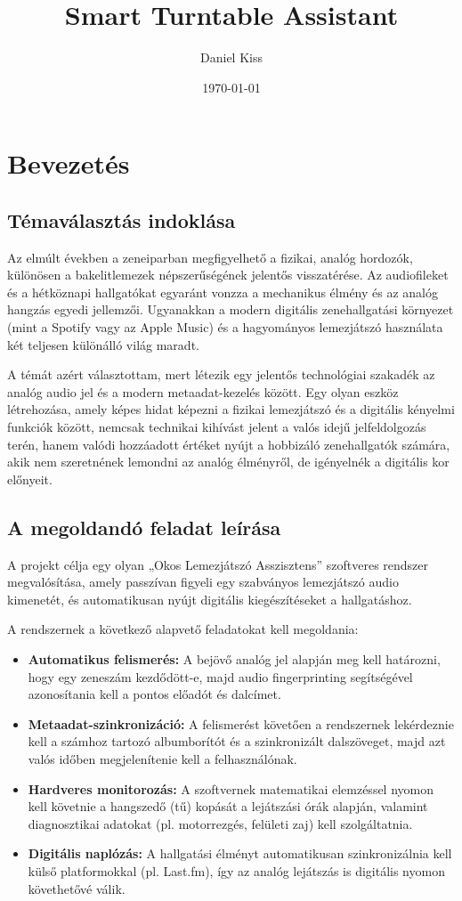 \documentclass[12pt,a4paper,hungarian]{report}
\title{Smart Turntable Assistant}
\author{Daniel Kiss}
\date{\today}
\begin{document}
 
\sloppy

\maketitle
\tableofcontents

\chapter{Bevezetés}

\section{Témaválasztás indoklása}
Az elmúlt években a zeneiparban megfigyelhető a fizikai, analóg hordozók, különösen a bakelitlemezek népszerűségének jelentős visszatérése. Az audiofileket és a hétköznapi hallgatókat egyaránt vonzza a mechanikus élmény és az analóg hangzás egyedi jellemzői. Ugyanakkan a modern digitális zenehallgatási környezet (mint a Spotify vagy az Apple Music) és a hagyományos lemezjátszó használata két teljesen különálló világ maradt. 

A témát azért választottam, mert létezik egy jelentős technológiai szakadék az analóg audio jel és a modern metaadat-kezelés között. Egy olyan eszköz létrehozása, amely képes hidat képezni a fizikai lemezjátszó és a digitális kényelmi funkciók között, nemcsak technikai kihívást jelent a valós idejű jelfeldolgozás terén, hanem valódi hozzáadott értéket nyújt a hobbizáló zenehallgatók számára, akik nem szeretnének lemondni az analóg élményről, de igényelnék a digitális kor előnyeit.

\section{A megoldandó feladat leírása}
A projekt célja egy olyan „Okos Lemezjátszó Asszisztens” szoftveres rendszer megvalósítása, amely passzívan figyeli egy szabványos lemezjátszó audio kimenetét, és automatikusan nyújt digitális kiegészítéseket a hallgatáshoz.

A rendszernek a következő alapvető feladatokat kell megoldania:
\begin{itemize}
    \item \textbf{Automatikus felismerés:} A bejövő analóg jel alapján meg kell határozni, hogy egy zeneszám kezdődött-e, majd audio fingerprinting segítségével azonosítania kell a pontos előadót és dalcímet.
    \item \textbf{Metaadat-szinkronizáció:} A felismerést követően a rendszernek lekérdeznie kell a számhoz tartozó albumborítót és a szinkronizált dalszöveget, majd azt valós időben megjelenítenie kell a felhasználónak.
    \item \textbf{Hardveres monitorozás:} A szoftvernek matematikai elemzéssel nyomon kell követnie a hangszedő (tű) kopását a lejátszási órák alapján, valamint diagnosztikai adatokat (pl. motorrezgés, felületi zaj) kell szolgáltatnia.
    \item \textbf{Digitális naplózás:} A hallgatási élményt automatikusan szinkronizálnia kell külső platformokkal (pl. Last.fm), így az analóg lejátszás is digitális nyomon követhetővé válik.
\end{itemize}
\end{document}
